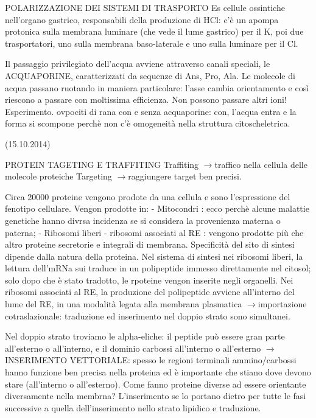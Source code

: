 \documentclass[a4paper,12pt]{article}
\newcommand{\lfreccia}{\ensuremath{\longrightarrow}}
\begin{document}
POLARIZZAZIONE DEI SISTEMI DI TRASPORTO
Es cellule ossintiche nell'organo gastrico, responsabili della produzione di HCl: c'è un apompa protonica sulla membrana luminare (che vede il lume gastrico) per il K, poi due trasportatori, uno sulla membrana baso-laterale e uno sulla luminare per il Cl.

Il passaggio privilegiato dell'acqua avviene attraverso canali speciali, le ACQUAPORINE, caratterizzati da sequenze di Ans, Pro, Ala. Le molecole di acqua passano ruotando in maniera particolare: l'asse cambia orientamento e così riescono a passare con moltissima efficienza. Non possono passare altri ioni!
Esperimento. ovpociti di rana con e senza acquaporine: con, l'acqua entra e la forma si scompone perchè non c'è omogeneità nella struttura citoscheletrica.

(15.10.2014)

PROTEIN TAGETING E TRAFFITING
Traffiting \lfreccia traffico nella cellula delle molecole proteiche
Targeting \lfreccia raggiungere target ben precisi.

Circa 20000 proteine vengono prodote da una cellula e sono l'espressione del fenotipo cellulare. Vengon prodotte in:
- Mitocondri : ecco perchè alcune malattie genetiche hanno divrsa incidenza se si considera la provenienza materna o paterna;
- Ribosomi liberi
- ribosomi associati al RE : vengono prodotte più che altro proteine secretorie e integrali di membrana.
Specificità del sito di sintesi dipende dalla natura della proteina.
Nel sistema di sintesi nei ribosomi liberi, la lettura dell'mRNa sui traduce in un polipeptide immesso direttamente nel citosol; solo dopo che è stato tradotto, le rpoteine vengon inserite negli organelli.
Nei ribosomi associati al RE, la produzione del polipeptide avviene all'interno del lume del RE, in una modalità legata alla membrana plasmatica \lfreccia importazione cotraslazionale: traduzione ed inserimento nel doppio strato sono simultanei.

Nel doppio strato troviamo le alpha-eliche: il peptide può essere gran parte all'esterno o all'interno, e il dominio carbossi all'interno o all'esterno \lfreccia INSERIMENTO VETTORIALE: spesso le regioni terminali ammino/carbossi hanno funzione ben precisa nella proteina ed è importante che stiano dove devono stare (all'interno o all'esterno).
Come fanno proteine diverse ad essere orientante diversamente nella membrna?
L'inserimento se lo portano dietro per tutte le fasi successive a quella dell'inserimento nello strato lipidico e traduzione.
\end{document}

